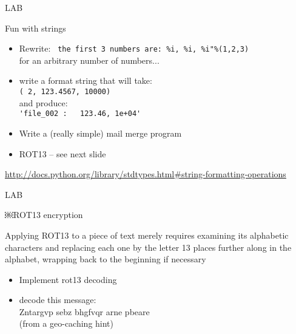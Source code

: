 \documentclass{beamer}
\begin{document}
\begin{frame}[fragile]{LAB}

{\Large Fun with strings}

\begin{itemize}
  \item Rewrite: \verb| the first 3 numbers are: %i, %i, %i"%(1,2,3)| \\
        for an arbitrary number of numbers...
  \item write a format string that will take:\\
        \verb|( 2, 123.4567, 10000)| \\
        and produce: \\
        \verb|'file_002 :   123.46, 1e+04'|
  \item Write a (really simple) mail merge program
  \item ROT13 -- see next slide
\end{itemize}

\vfill
\url{http://docs.python.org/library/stdtypes.html#string-formatting-operations}
\end{frame}

\begin{frame}[fragile]{LAB}

\vfill
\Large￼ROT13 encryption

\vfill
Applying ROT13 to a piece of text merely requires examining its alphabetic
characters and replacing each one by the letter 13 places further along in
the alphabet, wrapping back to the beginning if necessary

\begin{itemize}
  \item Implement rot13 decoding 
  \item  decode this message: \\
     \hspace{0.5in} Zntargvp sebz bhgfvqr arne pbeare \\
     \hspace{0.5in} (from a geo-caching hint)
\end{itemize}

\end{frame}
\end{document}
